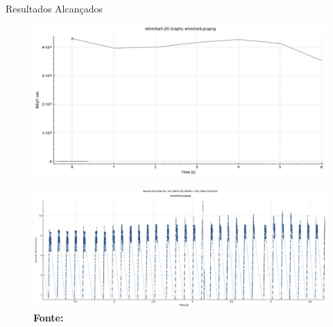 \documentclass[10pt]{beamer}
\begin{document}
\begin{frame}{Resultados Alcançados}
			\begin{figure}[h]
				\begin{center}
					\includegraphics[scale=0.24]{imagens/speed.jpg}\\
				\end{center}
				\label{fig:speed}
			\end{figure}

			\begin{figure}[h]
				\begin{center}
					\includegraphics[scale=0.19]{imagens/delay.jpg}\\
					{\footnotesize \textbf{Fonte:}}
				\end{center}
				\label{fig:delay}
			\end{figure}

\end{frame}
\end{document}

